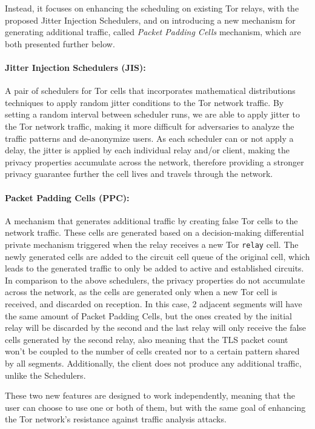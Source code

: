 Instead, it focuses on enhancing the scheduling on existing Tor relays, with the proposed Jitter Injection Schedulers, and on introducing a new mechanism for generating additional traffic, called \textit{Packet Padding Cells} mechanism, which are both presented further below.

\paragraph{Jitter Injection Schedulers (JIS):} A pair of schedulers for Tor cells that incorporates mathematical distributions techniques to apply random jitter conditions to the Tor network traffic. By setting a random interval between scheduler runs, we are able to apply jitter to the Tor network traffic, making it more difficult for adversaries to analyze the traffic patterns and de-anonymize users. As each scheduler can or not apply a delay, the jitter is applied by each individual relay and/or client, making the privacy properties accumulate across the network, therefore providing a stronger privacy guarantee further the cell lives and travels through the network.
\paragraph{Packet Padding Cells (PPC):} A mechanism that generates additional traffic by creating false Tor cells to the network traffic. These cells are generated based on a decision-making differential private mechanism triggered when the relay receives a new Tor \texttt{relay} cell. The newly generated cells are added to the circuit cell queue of the original cell, which leads to the generated traffic to only be added to active and established circuits.  In comparison to the above schedulers, the privacy properties do not accumulate across the network, as the cells are generated only when a new Tor cell is received, and discarded on reception. 
In this case, 2 adjacent segments will have the same amount of Packet Padding Cells, but the ones created by the initial relay will be discarded by the second and the last relay will only receive the false cells generated by the second relay, also meaning that the TLS packet count won't be coupled to the number of cells created nor to a certain pattern shared by all segments. Additionally, the client does not produce any additional traffic, unlike the Schedulers.

These two new features are designed to work independently, meaning that the user can choose to use one or both of them, but with the same goal of enhancing the Tor network's resistance against traffic analysis attacks.


